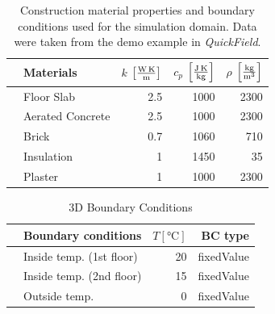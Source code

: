 \begin{table}[tbh]
    \centering
    \label{tab:construction_material_properties}
    \caption[3D Material Properties]{Construction material properties and boundary conditions used for the simulation domain. Data were taken from the demo example in \textit{QuickField}.}
      \centering
        \begin{tabular}{clrrr}    
            \toprule   
            & Materials       & $k$ $\left[ \si[per-mode=fraction]{\watt\per\metre\kelvin} \right]$ & $c_p$   $\left[ \si[per-mode=fraction]{\joule\per\kilogram\kelvin}\right]$ & $\rho$  $\left[ \si[per-mode=fraction]{\kilogram\per\cubic\metre} \right]$   \\
            \midrule
            & Floor Slab        & 2.5                        & 1000                      & 2300               \\
            & Aerated Concrete  & 2.5                        & 1000                      & 2300               \\
            & Brick             & 0.7                        & 1060                       & 710               \\
            & Insulation        & 1                         & 1450                      & 35               \\
            & Plaster           & 1                         & 1000                      & 2300              \\
            \bottomrule
        \end{tabular}
  
\end{table}


    \begin{table}[tbh]
   
      \caption{3D Boundary Conditions}
      \centering
        \begin{tabular}{llrr}    
            \toprule   
            & Boundary conditions          & $T [\si{\degreeCelsius}]$           & BC type                   \\ 
            \midrule
            & Inside temp.  (1st floor)         & 20                          & fixedValue                \\
            & Inside temp.  (2nd floor)          & 15                          & fixedValue                \\
            & Outside temp.  & 0                          & fixedValue                \\ 
            \bottomrule
        \end{tabular}

\end{table}






